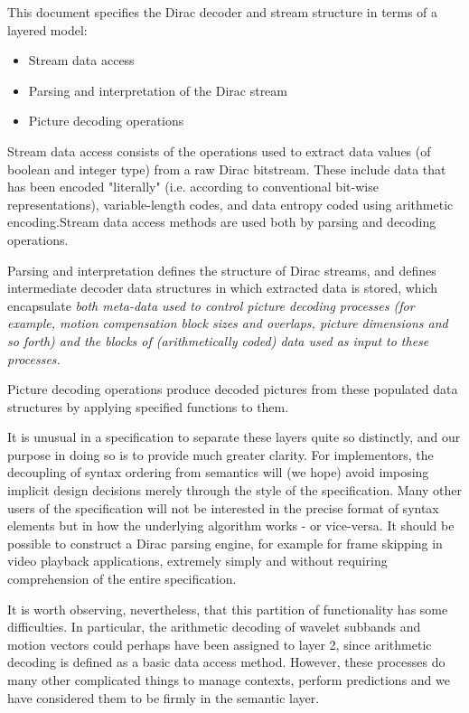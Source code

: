 This document specifies the Dirac decoder and stream structure in terms of
a layered model:

\begin{itemize}
    \item Stream data access
    \item Parsing and interpretation of the Dirac stream
    \item Picture decoding operations
\end{itemize}

Stream data access consists of the operations used to extract data values
(of boolean and integer type) from a raw Dirac bitstream. These include
data that has been encoded "literally" (i.e. according to conventional bit-wise
representations), variable-length codes, and data entropy coded using arithmetic
encoding.Stream data access methods are used both by parsing and decoding operations.

Parsing and interpretation defines the structure of Dirac streams, and defines
intermediate decoder data structures in which extracted data is stored, which 
encapsulate \em{both} meta-data used to control picture decoding processes (for 
example, motion compensation block sizes and overlaps, picture dimensions and
so forth) \em{and} the blocks of (arithmetically coded) data used as input to 
these processes.

Picture decoding operations produce decoded pictures from these populated
data structures by applying specified functions to them. 

It is unusual in a specification to separate these layers quite so distinctly, 
and our purpose in doing so is to provide much greater clarity. For implementors,
the decoupling of syntax ordering from semantics will (we hope) avoid imposing
implicit design decisions merely through the style of the specification. Many
other users of the specification will not be interested in the precise format
of syntax elements but in how the underlying algorithm works - or vice-versa.
It should be possible to construct a Dirac parsing engine, for example for
frame skipping in video playback applications, extremely simply and without
requiring comprehension of the entire specification.

It is worth observing, nevertheless, that this partition of functionality has 
some difficulties. In particular, the arithmetic decoding of wavelet subbands and 
motion vectors could perhaps have been assigned to layer 2, since arithmetic
decoding is defined as a basic data access method. However, these processes
do many other complicated things to manage contexts, perform predictions
and we have considered them to be firmly in the semantic layer.

